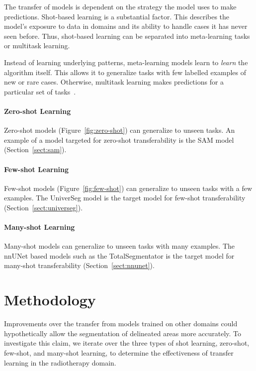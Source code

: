 \documentclass[12pt,twoside]{report}
\begin{document}
The transfer of models is dependent on the strategy the model uses to make predictions. Shot-based learning is a substantial factor. This describes the model's exposure to data in domains and its ability to handle cases it has never seen before. Thus, shot-based learning can be separated into meta-learning tasks or multitask learning. 

Instead of learning underlying patterns, meta-learning models learn to \textit{learn} the algorithm itself. This allows it to generalize tasks with few labelled examples of new or rare cases. Otherwise, multitask learning makes predictions for a particular set of tasks~\cite{deep-learning-book}.

\subsubsection{Zero-shot Learning}\label{sect:zero-shot-learning}

Zero-shot models (Figure~\ref{fig:zero-shot}) can generalize to unseen tasks. An example of a model targeted for zero-shot transferability is the SAM model (Section~\ref{sect:sam}).

\subsubsection{Few-shot Learning}\label{sect:few-shot-learning}

Few-shot models (Figure~\ref{fig:few-shot}) can generalize to unseen tasks with a few examples. The UniverSeg model is the target model for few-shot transferability (Section~\ref{sect:universeg}).

\subsubsection{Many-shot Learning}\label{sect:many-shot-learning}

Many-shot models can generalize to unseen tasks with many examples. The nnUNet based models such as the TotalSegmentator is the target model for many-shot transferability (Section~\ref{sect:nnunet}).

\chapter{Methodology}\label{sect:methodology}

Improvements over the transfer from models trained on other domains could hypothetically allow the segmentation of delineated areas more accurately. To investigate this claim, we iterate over the three types of shot learning, zero-shot, few-shot, and many-shot learning, to determine the effectiveness of transfer learning in the radiotherapy domain.
\end{document}
